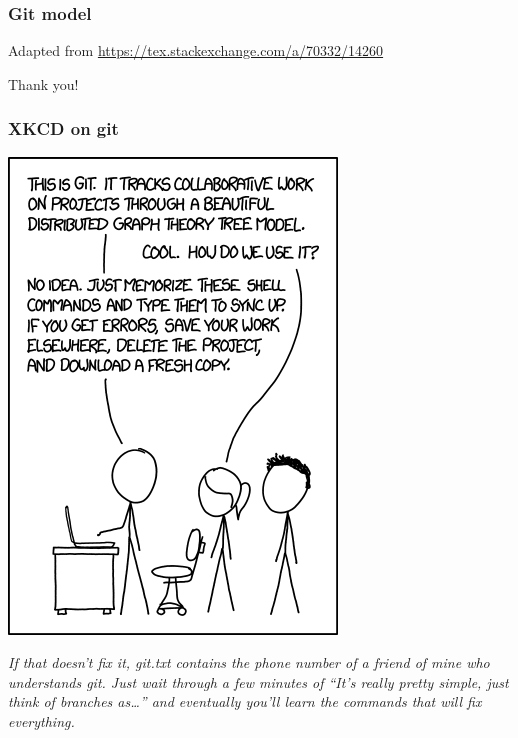 \documentclass[10pt,svgnames]{beamer}
\begin{document}




\begin{frame}
\frametitle{Git model}

Adapted from \href{https://tex.stackexchange.com/a/70332/14260}{https://tex.stackexchange.com/a/70332/14260}
\end{frame}

\begin{frame}[standout]
Thank you!
\end{frame}

\appendix

\begin{frame}
\label{xkcd_git}
\frametitle{XKCD on git \hfill\hyperlink{git_cons}{}}

\begin{center}
\includegraphics[height=0.5\paperheight]{figures/xkcd-git.png}
\end{center}

\emph{If that doesn't fix it, git.txt contains the phone number of a friend of mine who understands git.
Just wait through a few minutes of “It's really pretty simple, just think of branches as\ldots” and eventually you'll learn the commands that will fix everything.
}

\end{frame}
\end{document}
